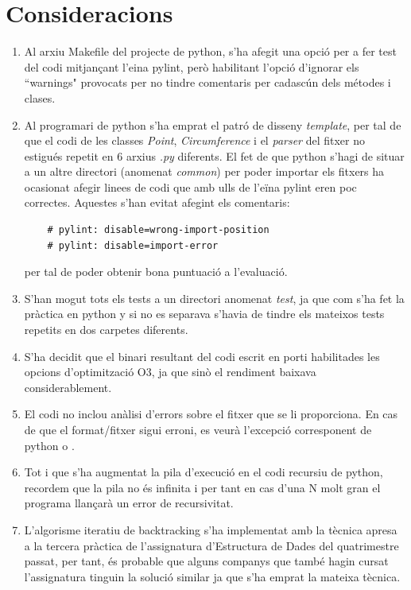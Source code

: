 \documentclass[12pt, letterpaper]{article}
\begin{document}
\section{Consideracions}
\begin{enumerate}
\item Al arxiu Makefile del projecte de python, s'ha afegit una opció per a fer test del codi mitjançant l'eina pylint, però habilitant l'opció d'ignorar els ``warnings" provocats per no tindre
    comentaris per cadascún dels métodes i clases.
\item Al programari de python s'ha emprat el patró de disseny \textit{template}, per tal de que el codi de les classes \textit{Point}, \textit{Circumference} i el \textit{parser} del fitxer no estigués repetit en 6 arxius \textit{.py} diferents. El fet de que python s'hagi de situar a un altre directori (anomenat \textit{common}) per poder importar els fitxers ha ocasionat afegir linees de codi que amb ulls de l'eïna pylint eren poc correctes. Aquestes s'han evitat afegint els comentaris:
    \begin{verbatim}
    # pylint: disable=wrong-import-position
    # pylint: disable=import-error
    \end{verbatim}
    per tal de poder obtenir bona puntuació a l'evaluació.
\item S'han mogut tots els tests a un directori anomenat \textit{test}, ja que com s'ha fet la pràctica en python y \cpluspluslogo  si no es separava s'havia de tindre els mateixos tests repetits en dos carpetes diferents.
\item S'ha decidit que el binari resultant del codi escrit en \cpluspluslogo porti habilitades les opcions d'optimització O3, ja que sinò el rendiment baixava considerablement.
\item El codi no inclou anàlisi d'errors sobre el fitxer que se li proporciona. En cas de que el format/fitxer sigui erroni, es veurà l'excepció corresponent 
    de python o \cpluspluslogo.
\item Tot i que s'ha augmentat la pila d'execució en el codi recursiu de python, recordem que la pila no és infinita i per tant en cas d'una N molt gran el programa llançarà un error de recursivitat.
\item L'algorisme iteratiu de backtracking s'ha implementat amb la tècnica apresa a la tercera pràctica de l'assignatura d'Estructura de Dades del quatrimestre passat, per tant, és probable que 
    alguns companys que també hagin cursat l'assignatura tinguin la solució similar ja que s'ha emprat la mateixa tècnica.

\end{enumerate}
\end{document}

